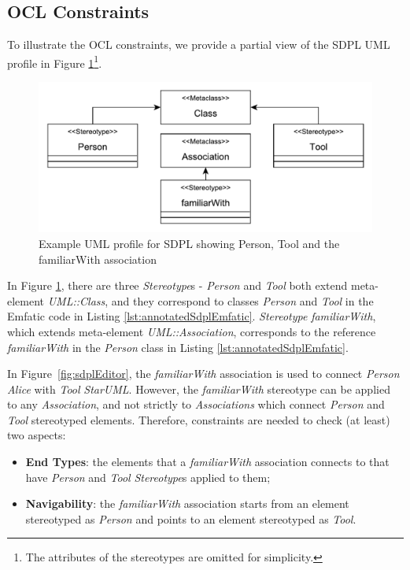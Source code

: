 \subsection{OCL Constraints}
\label{sec:constraints}

To illustrate the OCL constraints, we provide a partial view of the SDPL UML profile in Figure \ref{fig:sample_profile}\footnote{The attributes of the stereotypes are omitted for simplicity.}.

\begin{figure}[ht!]
	\centering
	\includegraphics[width=1\textwidth]{diagrams/example_profile}
	\caption[]{Example UML profile for SDPL showing Person, Tool and the familiarWith association}
	\label{fig:sample_profile}
\end{figure}

In Figure \ref{fig:sample_profile}, there are three \emph{Stereotype}s - \emph{Person} and \emph{Tool} both extend meta-element \emph{UML::Class}, and they correspond to classes \emph{Person} and \emph{Tool} in the Emfatic code in Listing \ref{lst:annotatedSdplEmfatic}. 
\emph{Stereotype} \emph{familiarWith}, which extends meta-element \emph{UML::Association}, corresponds to the reference \emph{familiarWith} in the \emph{Person} class in Listing \ref{lst:annotatedSdplEmfatic}.

In Figure~\ref{fig:sdplEditor}, the \textit{familiarWith} association is used to connect \textit{Person} \emph{Alice} with \textit{Tool} \emph{StarUML}. 
However, the \emph{familiarWith} stereotype can be applied to any \emph{Association}, and not strictly to \emph{Associations} which connect \emph{Person} and \emph{Tool} stereotyped elements. 
Therefore, constraints are needed to check (at least) two aspects:

\begin{itemize}
	\item \textbf{End Types}: the elements that a \emph{familiarWith} association connects to that have \emph{Person} and \emph{Tool} \textit{Stereotype}s applied to them;
	\item \textbf{Navigability}: the \emph{familiarWith} association starts from an element stereotyped as \emph{Person} and points to an element stereotyped as \emph{Tool}.
\end{itemize}

